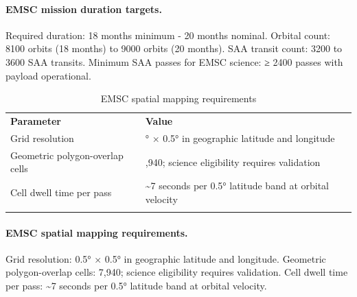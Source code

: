 \paragraph{EMSC mission duration targets.} Required duration: 18 months minimum - 20 months nominal. Orbital count: 8100 orbits (18 months) to 9000 orbits (20 months). SAA transit count: 3200 to 3600 SAA transits. Minimum SAA passes for EMSC science: ≥ 2400 passes with payload operational.
\fi

\ifrequirementsedition
\begin{longtable}{@{}
  >{\raggedright\arraybackslash}p{}
  >{\raggedright\arraybackslash}p{}@{}}
\caption{EMSC spatial mapping requirements}\label{tab:01-mission-context-8}\\
\toprule\noalign{}
\textbf{Parameter} & \textbf{Value} \\
Grid resolution & 0.5° × 0.5° in geographic latitude and longitude \\
Geometric polygon-overlap cells & 7,940; science eligibility requires validation \\
Cell dwell time per pass & \textasciitilde7 seconds per 0.5° latitude band at orbital velocity \\
\midrule\noalign{}
\endhead
\bottomrule\noalign{}
\endlastfoot
\end{longtable}
\else
\paragraph{EMSC spatial mapping requirements.} Grid resolution: 0.5° × 0.5° in geographic latitude and longitude. Geometric polygon-overlap cells: 7,940; science eligibility requires validation. Cell dwell time per pass: \textasciitilde7 seconds per 0.5° latitude band at orbital velocity.
\fi

